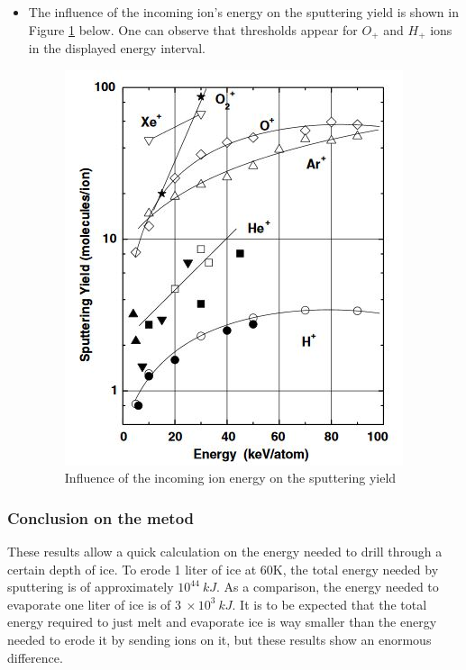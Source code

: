 \begin{itemize}
    \item {The influence of the incoming ion's energy on the sputtering yield is shown in Figure \ref{sputteringenergy} below. One can observe that thresholds appear for $O_{+}$ and $H_{+}$ ions in the displayed energy interval.}
    
    \begin{figure}[H]		
\begin{center}
\includegraphics{Paul/sputteringenergy.JPG}
\end{center}
\caption{Influence of the incoming ion energy on the sputtering yield}
\label{sputteringenergy}
\end{figure}

\end{itemize}

\subsubsection{Conclusion on the metod}

These results allow a quick calculation on the energy needed to drill through a certain depth of ice. To erode 1 liter of ice at 60K, the total energy needed by sputtering is of approximately $10^{44}~kJ$. As a comparison, the energy needed to evaporate one liter of ice is of $3~\times10^{3}~kJ$. It is to be expected that the total energy required to just melt and evaporate ice is way smaller than the energy needed to erode it by sending ions on it, but these results show an enormous difference.

